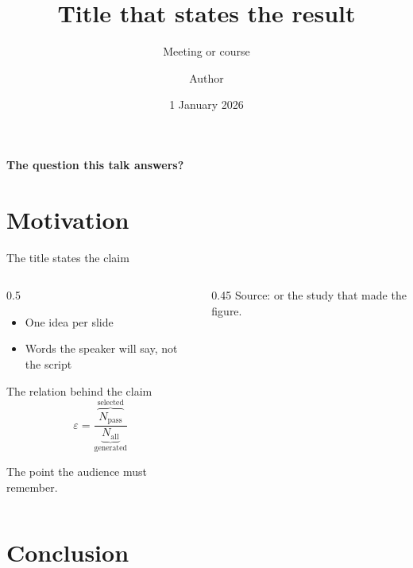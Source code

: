 \documentclass[aspectratio=169]{beamer}
\title{Title that states the result}
\subtitle{Meeting or course}
\date{1 January 2026}
\author{Author}
\begin{document}
{
\maketitle
}

\begin{frame}{}
  \centering\vfill\Large
  \textbf{The question this talk answers?}
  \vfill
\end{frame}

\section{Motivation}

\begin{frame}[label=claim]{The title states the claim}
  \begin{columns}
    \begin{column}{0.5\textwidth}
      \begin{itemize}
        \item One idea per slide
        \item Words the speaker will say, not the script
      \end{itemize}
      \pause
      \begin{block}{The relation behind the claim}
        \[ \varepsilon = \frac{\overbrace{N_\text{pass}}^{\text{selected}}}{\underbrace{N_\text{all}}_{\text{generated}}} \]
      \end{block}
      \textcolor{CtpRed}{The point the audience must remember.}
    \end{column}
    \begin{column}{0.45\textwidth}
      \scriptsize Source: \cite{key} or the study that made the figure.
    \end{column}
  \end{columns}
  \vfill
  \hyperlink{backup-details}{}
\end{frame}

\section{Conclusion}
\end{document}
